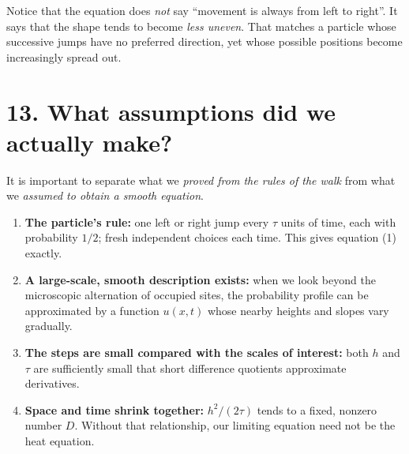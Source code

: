 \documentclass[11pt,a4paper]{article}
\begin{document}
\begin{center}
\end{center}

Notice that the equation does \emph{not} say ``movement is always from left to right''. It says that the shape tends to become \emph{less uneven}. That matches a particle whose successive jumps have no preferred direction, yet whose possible positions become increasingly spread out.

\clearpage
\section{13. What assumptions did we actually make?}
It is important to separate what we \emph{proved from the rules of the walk} from what we \emph{assumed to obtain a smooth equation}.

\begin{enumerate}[leftmargin=21pt,itemsep=6pt]
\item \textbf{The particle's rule:} one left or right jump every $\tau$ units of time, each with probability $1/2$; fresh independent choices each time. This gives equation (1) exactly.
\item \textbf{A large-scale, smooth description exists:} when we look beyond the microscopic alternation of occupied sites, the probability profile can be approximated by a function $u(x,t)$ whose nearby heights and slopes vary gradually.
\item \textbf{The steps are small compared with the scales of interest:} both $h$ and $\tau$ are sufficiently small that short difference quotients approximate derivatives.
\item \textbf{Space and time shrink together:} $h^2/(2\tau)$ tends to a fixed, nonzero number $D$. Without that relationship, our limiting equation need not be the heat equation.
\end{enumerate}
\end{document}
